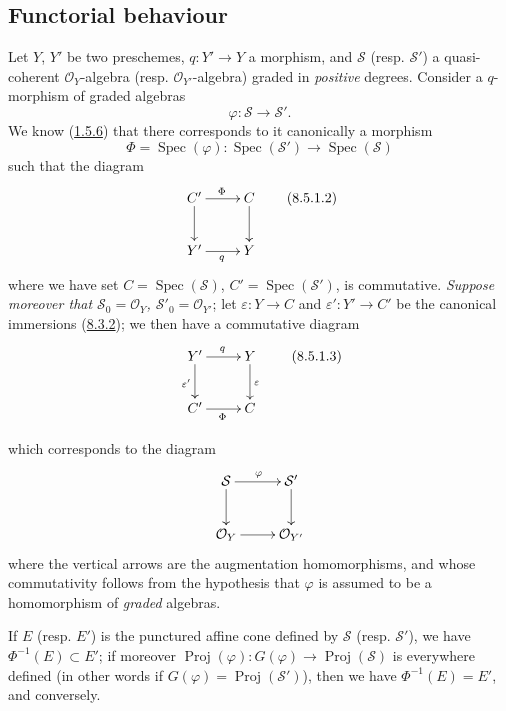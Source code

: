 \subsection{Functorial behaviour}
\label{subsection:II.8.5}

\begin{env}[8.5.1]
\label{II.8.5.1}
Let $Y$, $Y'$ be two preschemes, $q:Y'\to Y$ a morphism, and
$\mathcal{S}$ (resp. $\mathcal{S}'$) a quasi-coherent $\mathcal{O}_Y$-algebra
(resp. $\mathcal{O}_{Y'}$-algebra) graded in
\emph{positive} degrees. Consider a $q$-morphism of graded algebras
\begin{equation}
\label{II.8.5.1.1}
  \varphi:\mathcal{S}\to\mathcal{S}'.
\tag{8.5.1.1}
\end{equation}
We know (\hyperref[II.1.5.6]{1.5.6}) that there corresponds to it canonically a
morphism
\[
  \Phi=\operatorname{Spec}(\varphi):
  \operatorname{Spec}(\mathcal{S}')\to\operatorname{Spec}(\mathcal{S})
\]
such that the diagram
\begin{equation}
\label{II.8.5.1.2}
  \xymatrix{
    C'\ar[r]^{\Phi}\ar[d] & C\ar[d]\\
    Y'\ar[r]_{q} & Y
  }
\tag{8.5.1.2}
\end{equation}
where we have set $C=\operatorname{Spec}(\mathcal{S})$,
$C'=\operatorname{Spec}(\mathcal{S}')$, is commutative.
\emph{Suppose moreover that
$\mathcal{S}_0=\mathcal{O}_Y$, $\mathcal{S}'_0=\mathcal{O}_{Y'}$}; let
$\varepsilon:Y\to C$ and $\varepsilon':Y'\to C'$ be the canonical immersions
(\hyperref[II.8.3.2]{8.3.2}); we then have a commutative diagram
\begin{equation}
\label{II.8.5.1.3}
  \xymatrix{
    Y'\ar[r]^{q}\ar[d]_{\varepsilon'} & Y\ar[d]^{\varepsilon}\\
    C'\ar[r]_{\Phi} & C
  }
\tag{8.5.1.3}
\end{equation}

which corresponds to the diagram
\[
  \xymatrix{
    \mathcal{S}\ar[r]^{\varphi}\ar[d] & \mathcal{S}'\ar[d]\\
    \mathcal{O}_Y\ar[r] & \mathcal{O}_{Y'}
  }
\]
where the vertical arrows are the augmentation homomorphisms, and whose
commutativity follows from the hypothesis that $\varphi$ is assumed to be a
homomorphism of \emph{graded} algebras.
\end{env}

\begin{proposition}[8.5.2]
\label{II.8.5.2}
If $E$ \textup{(resp. $E'$)} is the punctured affine cone defined by $\mathcal{S}$
\textup{(resp. $\mathcal{S}'$)}, we have $\Phi^{-1}(E)\subset E'$; if moreover
$\operatorname{Proj}(\varphi):G(\varphi)\to\operatorname{Proj}(\mathcal{S})$
is everywhere defined (in other words if
$G(\varphi)=\operatorname{Proj}(\mathcal{S}')$), then we have
$\Phi^{-1}(E)=E'$, and conversely.
\end{proposition}

